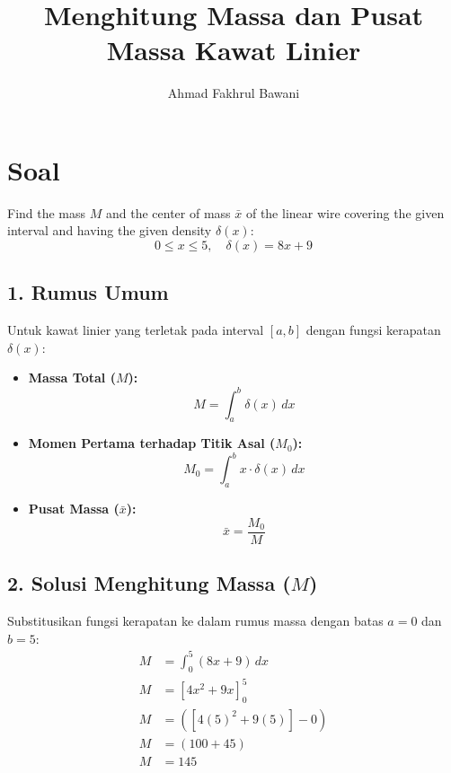 \documentclass[12pt,a4paper]{article}
\title{Menghitung Massa dan Pusat Massa Kawat Linier}
\author{Ahmad Fakhrul Bawani}
\date{}
\begin{document}
\maketitle

\section*{Soal}

Find the mass $M$ and the center of mass $\bar{x}$ of the linear wire covering the given interval and having the given density $\delta(x)$:
\begin{equation*}
  0 \le x \le 5, \quad \delta(x) = 8x + 9
\end{equation*}

\subsection*{1. Rumus Umum}
Untuk kawat linier yang terletak pada interval $[a, b]$ dengan fungsi kerapatan $\delta(x)$:
\begin{itemize}
  \item \textbf{Massa Total ($M$):}
    \begin{equation*}
      M = \int_{a}^{b} \delta(x) \, dx
    \end{equation*}
  \item \textbf{Momen Pertama terhadap Titik Asal ($M_0$):}
    \begin{equation*}
      M_0 = \int_{a}^{b} x \cdot \delta(x) \, dx
    \end{equation*}
  \item \textbf{Pusat Massa ($\bar{x}$):}
    \begin{equation*}
      \bar{x} = \frac{M_0}{M}
    \end{equation*}
\end{itemize}

\subsection*{2. Solusi Menghitung Massa ($M$)}
Substitusikan fungsi kerapatan ke dalam rumus massa dengan batas $a = 0$ dan $b = 5$:
\begin{align*}
  M &= \int_{0}^{5} (8x + 9) \, dx \\
  M &= \left[ 4x^2 + 9x \right]_{0}^{5} \\
  M &= \left( \left[ 4(5)^2 + 9(5) \right] - 0 \right) \\
  M &= (100 + 45) \\
  M &= 145
\end{align*}
\end{document}
